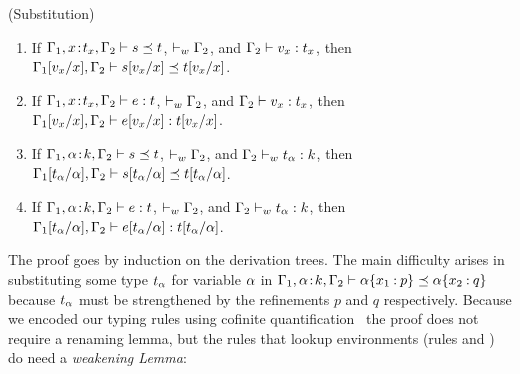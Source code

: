 \begin{lemma}\label{substitution} \label{lem:subst} (Substitution)
    \begin{enumerate}
        \item If $\isSubType{\tcenv_1,\bind{x}{t_x},\tcenv_2}{s}{t}$,
                 $\isWellFormedE{\tcenv_2}$,
            and $\hastype{\tcenv_2}{v_x}{t_x}$,
            then $\isSubType{\subst{\tcenv_1}{x}{v_x},\tcenv_2}{\subst{s}{x}{v_x}}{\subst{t}{x}{v_x}}$.
        \item If $\hastype{\tcenv_1,\bind{x}{t_x},\tcenv_2}{e}{t}$,
                 $\isWellFormedE{\tcenv_2}$,
            and $\hastype{\tcenv_2}{v_x}{t_x}$,
            then $\hastype{\subst{\tcenv_1}{x}{v_x},\tcenv_2}{\subst{e}{x}{v_x}}{\subst{t}{x}{v_x}}$.
        \item If $\isSubType{\tcenv_1,\bind{\al}{\skind},\tcenv_2}{s}{t}$,
                $\isWellFormedE{\tcenv_2}$,
            and $\isWellFormed{\tcenv_2}{t_\al}{k}$,
            then $\isSubType{\subst{\tcenv_1}{\al}{t_\al},\tcenv_2}{\subst{s}{\al}{t_\al}}{\subst{t}{\al}{t_\al}}$.
        \item If $\hastype{\tcenv_1,\bind{\al}{\skind},\tcenv_2}{e}{t}$,
                 $\isWellFormedE{\tcenv_2}$,
            and $\isWellFormed{\tcenv_2}{t_\al}{\skind}$,
            then $\hastype{\subst{\tcenv_1}{\al}{t_\al},\tcenv_2}{\subst{e}{\al}{t_\al}}{\subst{t}{\al}{t_\al}}$.
    \end{enumerate}
\end{lemma}

The proof goes by induction on the derivation trees. 
The main difficulty arises
in substituting some type
$t_\al$ for variable $\al$
in $\isSubType{\tcenv_1,\bind{\al}{\skind},\tcenv_2}{\breft{\al}{x_1}{p}}{\breft{\al}{x_2}{q}}$
because $t_\al$  must be
strengthened  by
the refinements $p$ and
$q$ respectively.
%
Because we encoded our typing rules using 
cofinite quantification~\cite{AydemirCPPW08}
the proof does not require a renaming lemma, but 
the rules that lookup environments 
(rules \tVar and \wtVar) do need a \emph{weakening Lemma}:

